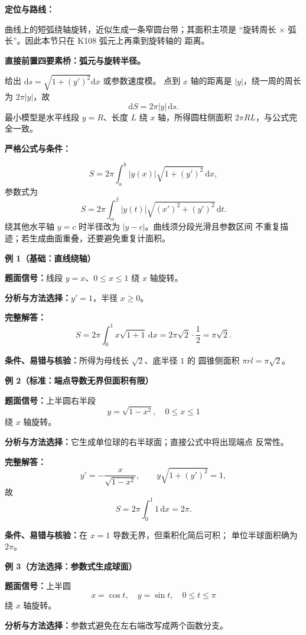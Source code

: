 \begin{knowledgeBox}
\textbf{定位与路线：}

曲线上的短弧绕轴旋转，近似生成一条窄圆台带；其面积主项是
“旋转周长 \(\times\) 弧长”。因此本节只在 K108 弧元上再乘到旋转轴的
距离。

\textbf{直接前置四要素桥：弧元与旋转半径。}

给出
\(\mathrm ds=\sqrt{1+(y')^2}\mathrm dx\) 或参数速度模。
点到 \(x\) 轴的距离是 \(|y|\)，绕一周的周长为 \(2\pi|y|\)，故
\[
\mathrm dS=2\pi|y|\,\mathrm ds.
\]
最小模型是水平线段 \(y=R\)、长度 \(L\) 绕 \(x\) 轴，所得圆柱侧面积
\(2\pi RL\)，与公式完全一致。

\textbf{严格公式与条件：}

\[
\boxed{S=2\pi\int_a^b|y(x)|
\sqrt{1+(y')^2}\,\mathrm dx,}
\]
参数式为
\[
S=2\pi\int_\alpha^\beta|y(t)|
\sqrt{(x')^2+(y')^2}\,\mathrm dt.
\]
绕其他水平轴 \(y=c\) 时半径改为 \(|y-c|\)。曲线须分段光滑且参数区间
不重复描迹；若生成曲面重叠，还要避免重复计面积。

\textbf{例 1（基础：直线绕轴）}

\textbf{题面信号：}线段 \(y=x\)、\(0\le x\le1\) 绕 \(x\) 轴旋转。

\textbf{分析与方法选择：}\(y'=1\)，半径 \(x\ge0\)。

\textbf{完整解答：}
\[
S=2\pi\int_0^1x\sqrt{1+1}\,\mathrm dx
=2\pi\sqrt2\cdot\frac12=\pi\sqrt2.
\]

\textbf{条件、易错与核验：}所得为母线长 \(\sqrt2\)、底半径 \(1\) 的
圆锥侧面积 \(\pi rl=\pi\sqrt2\)。

\textbf{例 2（标准：端点导数无界但面积有限）}

\textbf{题面信号：}上半圆右半段
\[
y=\sqrt{1-x^2},\quad0\le x\le1
\]
绕 \(x\) 轴旋转。

\textbf{分析与方法选择：}它生成单位球的右半球面；直接公式中将出现端点
反常性。

\textbf{完整解答：}
\[
y'=-\frac{x}{\sqrt{1-x^2}},\qquad
y\sqrt{1+(y')^2}=1,
\]
故
\[
S=2\pi\int_0^1 1\,\mathrm dx=2\pi.
\]

\textbf{条件、易错与核验：}在 \(x=1\) 导数无界，但乘积化简后可积；
单位半球面积确为 \(2\pi\)。

\textbf{例 3（方法选择：参数式生成球面）}

\textbf{题面信号：}上半圆
\[
x=\cos t,\quad y=\sin t,\quad0\le t\le\pi
\]
绕 \(x\) 轴旋转。

\textbf{分析与方法选择：}参数式避免在左右端改写成两个函数分支。


\end{knowledgeBox}
